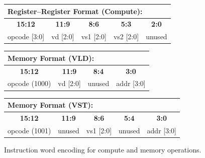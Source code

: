 \begin{figure}[htbp]
  \centering
  \small
  \begin{tabular}{|c|c|c|c|c|}
    \multicolumn{5}{l}{\textbf{Register--Register Format (Compute):}} \\
    \hline
    \textbf{15:12} & \textbf{11:9} & \textbf{8:6} & \textbf{5:3} & \textbf{2:0} \\
    \hline
    opcode [3:0] & vd [2:0] & vs1 [2:0] & vs2 [2:0] & unused \\
    \hline
  \end{tabular}
  \vspace{1.5ex}

  \begin{tabular}{|c|c|c|c|}
    \multicolumn{4}{l}{\textbf{Memory Format (VLD):}} \\
    \hline
    \textbf{15:12} & \textbf{11:9} & \textbf{8:4} & \textbf{3:0} \\
    \hline
    opcode (1000) & vd [2:0] & unused & addr [3:0] \\
    \hline
  \end{tabular}
  \vspace{1.5ex}

  \begin{tabular}{|c|c|c|c|c|}
    \multicolumn{5}{l}{\textbf{Memory Format (VST):}} \\
    \hline
    \textbf{15:12} & \textbf{11:9} & \textbf{8:6} & \textbf{5:4} & \textbf{3:0} \\
    \hline
    opcode (1001) & unused & vs1 [2:0] & unused & addr [3:0] \\
    \hline
  \end{tabular}
  \caption{Instruction word encoding for compute and memory operations.}
  \label{fig:instr_format}
\end{figure}

